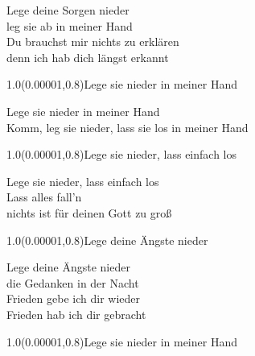 \documentclass[aspectratio=169]{beamer}
\begin{document}
\color{white}
\begin{frame}
\centering
\color{white}
\huge{Lege deine Sorgen nieder} \\
\huge{leg sie ab in meiner Hand} \\
\huge{Du brauchst mir nichts zu erklären} \\
\huge{denn ich hab dich längst erkannt} \\

\begin{textblock}{1.0}(0.00001,0.8)\color{gray}\normalsize{Lege sie nieder in meiner Hand}\end{textblock}
\end{frame}

\begin{frame}
\centering
\color{white}
\huge{Lege sie nieder in meiner Hand} \\
\huge{Komm, leg sie nieder, lass sie los in meiner Hand} \\

\begin{textblock}{1.0}(0.00001,0.8)\color{gray}\normalsize{Lege sie nieder, lass einfach los}\end{textblock}
\end{frame}

\begin{frame}
\centering
\color{white}
\huge{Lege sie nieder, lass einfach los} \\
\huge{Lass alles fall'n} \\
\huge{nichts ist für deinen Gott zu groß} \\

\begin{textblock}{1.0}(0.00001,0.8)\color{gray}\normalsize{Lege deine Ängste nieder}\end{textblock}
\end{frame}

\begin{frame}
\centering
\color{white}
\huge{Lege deine Ängste nieder} \\
\huge{die Gedanken in der Nacht} \\
\huge{Frieden gebe ich dir wieder} \\
\huge{Frieden hab ich dir gebracht} \\

\begin{textblock}{1.0}(0.00001,0.8)\color{gray}\normalsize{Lege sie nieder in meiner Hand}\end{textblock}
\end{frame}
\end{document}
